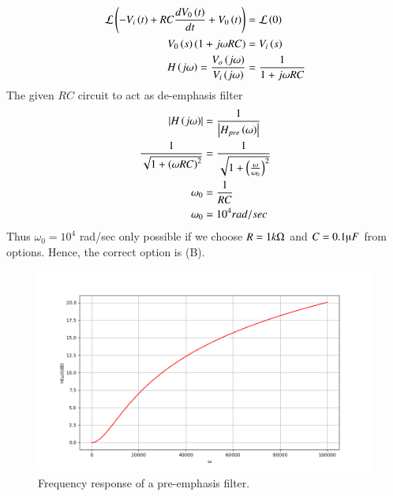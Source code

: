 \documentclass[journal,12pt,onecolumn]{IEEEtran}
\theoremstyle{remark}
\begin{document}
    \begin{align}
        \mathcal{L}\left( -V_i\left(t\right) + RC\frac{dV_0\left(t\right)}{dt} + V_0\left(t\right)\right)&=\mathcal{L}\left(0\right) \\
        V_0\left(s\right)\left(1+j\omega RC\right)&= V_i\left(s\right) \\
         H\left(j\omega\right)=\frac{V_o\left(j\omega\right)}{V_i\left(j\omega\right)} &= \frac{1}{1+j\omega RC}
    \end{align}
The given $RC$ circuit to act as de-emphasis filter
\begin{align}
    \left\vert H\left(j\omega\right)\right\vert&= \frac{1}{\left\vert H_{pre}\left(\omega\right)\right\vert} \\
    \frac{1}{\sqrt{1+\left(\omega RC\right)^2}}&= \frac{1}{\sqrt{1+\left(\frac{\omega}{\omega_0}\right)^2}} \\
    \omega_0&= \frac{1}{RC} \\
    \omega_0&=10^4 rad/sec
\end{align}
Thus $\omega_0=10^4$ rad/sec only possible if we choose $R=1k\ohm$ and $C=0.1\micro F$ from options. Hence, the correct option is (B).
\begin{figure}[ht]
        \centering
        \includegraphics[width=\columnwidth]{2022/EC/51/figs/plot.png}
        \caption{Frequency response of a pre-emphasis filter.}
    \end{figure}
\end{document}
